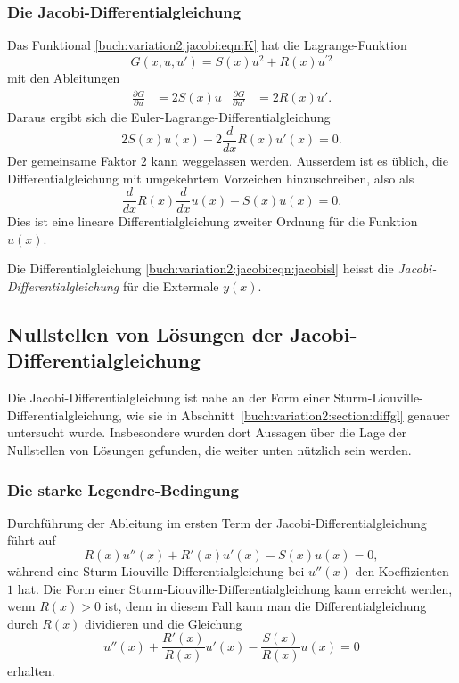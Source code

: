 \subsubsection{Die Jacobi-Differentialgleichung}
Das Funktional
\eqref{buch:variation2:jacobi:eqn:K}
hat die Lagrange-Funk\-tion 
\[
G(x,u,u') = S(x) u^2 + R(x) u^{\prime 2}
\]
mit den Ableitungen
\begin{align*}
\frac{\partial G}{\partial u}
&=
2S(x) u
&
\frac{\partial G}{\partial u'}
&=
2R(x) u'.
\end{align*}
Daraus ergibt sich die Euler-Lagrange-Differentialgleichung
\[
2S(x) u(x) - 2\frac{d}{dx} R(x) u'(x) = 0.
\]
Der gemeinsame Faktor $2$ kann weggelassen werden.
Ausserdem ist es üblich, die Differentialgleichung mit umgekehrtem
Vorzeichen hinzuschreiben, also als
\begin{equation}
\frac{d}{dx} R(x)\frac{d}{dx} u(x) - S(x) u(x) = 0.
\label{buch:variation2:jacobi:eqn:jacobisl}
\end{equation}
Dies ist eine lineare Differentialgleichung zweiter Ordnung für die Funktion
$u(x)$.

\begin{definition}
Die Differentialgleichung
\eqref{buch:variation2:jacobi:eqn:jacobisl}
heisst die {\em Jacobi-Differentialgleichung}
für die Extermale $y(x)$.
\end{definition}

\subsection{Nullstellen von Lösungen der Jacobi-Differentialgleichung
\label{buch:variation2:jacobi:subection:nullstellen}}
Die Jacobi-Differentialgleichung ist nahe an der Form einer
Sturm-Liouville-Differential\-gleichung,
wie sie in Abschnitt~\ref{buch:variation2:section:diffgl} genauer
untersucht wurde.
Insbesondere wurden dort Aussagen über die Lage der Nullstellen von
Lösungen gefunden, die weiter unten nützlich sein werden.

%
%
\subsubsection{Die starke Legendre-Bedingung}
Durchführung der Ableitung im ersten Term der Jacobi-Differentialgleichung
führt auf
\[
R(x) u''(x) + R'(x) u'(x) - S(x) u(x) = 0,
\]
während eine Sturm-Liouville-Differentialgleichung bei $u''(x)$ den
Koeffizienten $1$ hat.
Die Form einer Sturm-Liouville-Differentialgleichung kann erreicht
werden, wenn $R(x)>0$ ist, denn in diesem Fall kann man die
Differentialgleichung durch $R(x)$ dividieren und die Gleichung
\[
u''(x) + \frac{R'(x)}{R(x)} u'(x) -\frac{S(x)}{R(x)} u(x) = 0
\]
erhalten.

